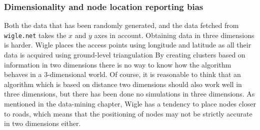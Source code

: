 \subsubsection{Dimensionality and node location reporting bias} 
Both the data that has been randomly generated, and the data fetched from \verb|wigle.net| takes the $x$ and $y$ axes in account. Obtaining data in three dimensions is harder.
Wigle places the access points using longitude and latitude as all their data is acquired using ground-level triangulation
By creating clusters based on information in two dimensions there is no way to know how the algorithm behaves in a 3-dimensional world. Of course, it is reasonable to think that an algorithm
which is based on distance two dimensions should also work well in three dimensions, but there has been done no simulations in three dimensions. As mentioned in the data-mining chapter, Wigle has a 
tendency to place nodes closer to roads, which means that the positioning of nodes may not be strictly accurate in two dimensions either. 



